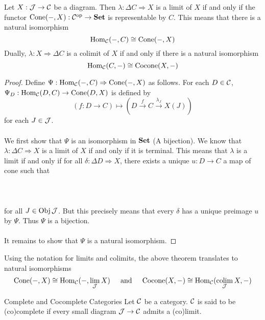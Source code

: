 \documentclass[a4paper]{article}
\begin{document}
\begin{thm}{}{} Let $X:\mathcal{J}\to\mathcal{C}$ be a diagram. Then $\lambda:\Delta C\Rightarrow X$ is a limit of $X$ if and only if the functor $\text{Cone}(-,X):\mathcal{C}^\text{op}\to\bold{Set}$ is representable by $C$. This means that there is a natural isomorphism $$\operatorname{Hom}_{\mathcal{C}}(-,C)\cong\text{Cone}(-,X)$$ 
Dually, $\lambda:X\Rightarrow\Delta C$ is a colimit of $X$ if and only if there is a natural isomorphism $$\operatorname{Hom}_{\mathcal{C}}(C,-)\cong\text{Cocone}(X,-)$$ \tcbline
\begin{proof}
Define $\Psi:\operatorname{Hom}_{\mathcal{C}}(-,C)\Rightarrow\text{Cone}(-,X)$ as follows. For each $D\in\mathcal{C}$, $\Psi_D:\operatorname{Hom}_{\mathcal{C}}(D,C)\to\text{Cone}(D,X)$ is defined by $$(f:D\to C)\mapsto\left(D\overset{f}{\rightarrow}C\overset{\lambda_J}{\rightarrow}X(J)\right)$$ for each $J\in\mathcal{J}$. \\~\\

We first show that $\Psi$ is an isomorphism in $\bold{Set}$ (A bijection). We know that $\lambda:\Delta C\Rightarrow X$ is a limit of $X$ if and only if it is terminal. This means that $\lambda$ is a limit if and only if for all $\delta:\Delta D\Rightarrow X$, there exists a unique $u:D\to C$ a map of cone such that \\~\\
\\~\\
for all $J\in\operatorname{Obj}\mathcal{J}$. But this precisely means that every $\delta$ has a unique preimage $u$ by $\Psi$. Thus $\Psi$ is a bijection. \\~\\

It remains to show that $\Psi$ is a natural isomorphism. 
\end{proof}
\end{thm}

Using the notation for limits and colimits, the above theorem translates to natural isomorphisms $$\text{Cone}(-,X)\cong\operatorname{Hom}_{\mathcal{C}}(-,\lim_{\mathcal{J}} X)\;\;\;\;\text{ and }\;\;\;\;\text{Cocone}(X,-)\cong\operatorname{Hom}_{\mathcal{C}}(\operatorname*{colim}_{\mathcal{J}} X,-)$$

\begin{defn}{Complete and Cocomplete Categories}{} Let $\mathcal{C}$ be a category. $\mathcal{C}$ is said to be (co)complete if every small diagram $\mathcal{J}\to\mathcal{C}$ admits a (co)limit. 
\end{defn}
\end{document}
